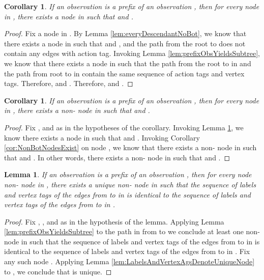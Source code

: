 \documentclass[11pt]{article}
\numberwithin{theorem}{section}
\newtheorem{lemma}[theorem]{Lemma}
\newtheorem{corollary}[theorem]{Corollary}
\begin{document}
\begin{corollary}\label{cor:prefixObsPrefixExe}
If an observation  is a prefix of an observation , then for every node  in , there exists a node  in  such that  and .
\end{corollary}
\begin{proof}
Fix a node  in . By Lemma \ref{lem:everyDescendantNoBot}, we know that there exists a node  in  such that  and , and the path from the root to  does not contain any edges with  action tag. Invoking Lemma \ref{lem:prefixObsYieldsSubtree}, we know that there exists a node  in  such that the path from the root to  in  and the path from root to  in  contain the same sequence of action tags and vertex tags. Therefore,  and . Therefore,  and .
\end{proof}



\begin{corollary}\label{cor:NonBotExistsFromPrefix}
If an observation  is a prefix of an observation , then for every node  in , there exists a non- node  in  such that  and .
\end{corollary}
\begin{proof}
Fix ,  and  as in the hypotheses of the corollary. Invoking Lemma \ref{cor:prefixObsPrefixExe}, we know there exists a node  in  such that  and . Invoking Corollary \ref{cor:NonBotNodesExist} on node , we know that there exists a non- node  in  such that  and . In other words, there exists a non- node  in  such that  and .
\end{proof}

\begin{lemma}\label{lem:UniqueNodeMappingFromPrefixObsToSuperObs}
If an observation  is a prefix of an observation , then for every node non- node  in , there exists a unique non- node  in  such that the sequence of labels and vertex tags of the edges from  to  in  is identical to the sequence of labels and vertex tags of the edges from  to  in .
\end{lemma}
\begin{proof}
Fix , , and  as in the hypothesis of the lemma. Applying Lemma \ref{lem:prefixObsYieldsSubtree} to the path in  from  to  we conclude at least one non- node  in  such that the sequence of labels and vertex tags of the edges from  to  in  is identical to the sequence of labels and vertex tags of the edges from  to  in . Fix any such node . Applying Lemma \ref{lem:LabelsAndVertexAgsDenoteUniqueNode} to , we conclude that  is unique.
\end{proof}
\end{document}
